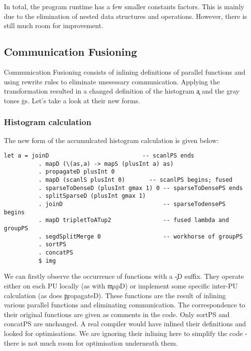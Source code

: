     In total, the program runtime has a few smaller constants factors. This is mainly due to the elimination of nested data structures
    and operations. However, there is still much room for improvement.
  \subsection{Communication Fusioning}
    
    Communication Fusioning consists of inlining definitions of parallel functions and using rewrite rules to eliminate
    unesessary communication. Applying the transformation resulted in a changed definition of the histogram \c{a} and the
    gray tones \c{gs}. Let's take a look at their new forms.
    
    \subsubsection{Histogram calculation}
      The new form of the accumulcated histogram calculation is given below:
      \begin{lstlisting}
let a = joinD                           -- scanlPS ends
          . mapD (\(as,a) -> mapS (plusInt a) as)
          . propagateD plusInt 0
          . mapD (scanlS plusInt 0)       -- scanlPS begins; fused
          . sparseToDenseD (plusInt gmax 1) 0 -- sparseToDensePS ends
          . splitSparseD (plusInt gmax 1)     
          . joinD                             -- sparseTodensePS begins
          . mapD tripletToATup2               -- fused lambda and groupPS 
          . segdSplitMerge 0                  -- workhorse of groupPS
          . sortPS
          . concatPS
          $ img
      \end{lstlisting}
      We can firstly observe the occurrence of functions with a \c{-D} suffix. They operate either
      on each PU locally (as with \c{mapD}) or implement some specific inter-PU calculation (as does \c{propagateD}).
      These functions are the result of inlining various parallel functions and eliminating communication.
      The correspondence to their original functions are given as comments in the code. Only sortPS and concatPS
      are unchanged. A real compiler would have inlined their definitions and looked for optimisations.
      We are ignoring their inlining here to simplify the code - there is not much room for optimisation underneath them.
      
